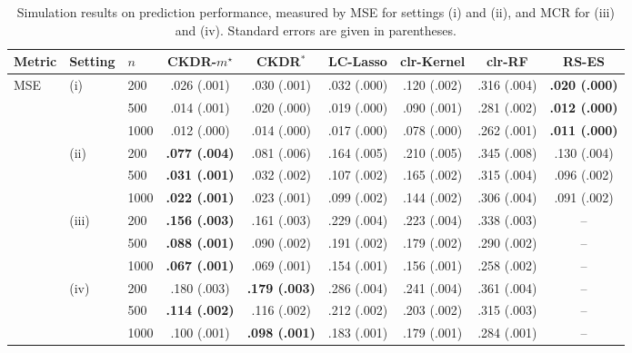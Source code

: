 \begin{table}[t]
\centering
\caption{Simulation results on prediction performance, measured by MSE for settings (i) and (ii), and MCR for (iii) and (iv). Standard errors are given in parentheses.}
\label{tab:simulation_predictions}
\scriptsize
\begin{tabular*}{\columnwidth}{@{\extracolsep{\fill}}lllcccccc}
\toprule
Metric & Setting & $n$ & CKDR-$m^\star$ & CKDR$^*$ & LC-Lasso & clr-Kernel & clr-RF & RS-ES \\
\midrule
 \multirow{7}{*}{MSE} & \multirow{3}{*}{(i)} & 200 & .026 (.001) & .030 (.001) & .032 (.000) & .120 (.002) & .316 (.004) & \textbf{.020 (.000)} \\
  &  & 500 & .014 (.001) & .020 (.000) & .019 (.000) & .090 (.001) & .281 (.002) & \textbf{.012 (.000)} \\
  &  & 1000 & .012 (.000) & .014 (.000) & .017 (.000) & .078 (.000) & .262 (.001) & \textbf{.011 (.000)} \\
 \addlinespace
  & \multirow{3}{*}{(ii)} & 200 & \textbf{.077 (.004)} & .081 (.006) & .164 (.005) & .210 (.005) & .345 (.008) & .130 (.004) \\
  &  & 500 & \textbf{.031 (.001)} & .032 (.002) & .107 (.002) & .165 (.002) & .315 (.004) & .096 (.002) \\
  &  & 1000 & \textbf{.022 (.001)} & .023 (.001) & .099 (.002) & .144 (.002) & .306 (.004) & .091 (.002) \\
\midrule
 \multirow{7}{*}{MCR} & \multirow{3}{*}{(iii)} & 200 & \textbf{.156 (.003)} & .161 (.003) & .229 (.004) & .223 (.004) & .338 (.003) & -- \\
  &  & 500 & \textbf{.088 (.001)} & .090 (.002) & .191 (.002) & .179 (.002) & .290 (.002) & -- \\
  &  & 1000 & \textbf{.067 (.001)} & .069 (.001) & .154 (.001) & .156 (.001) & .258 (.002) & -- \\
 \addlinespace
  & \multirow{3}{*}{(iv)} & 200 & .180 (.003) & \textbf{.179 (.003)} & .286 (.004) & .241 (.004) & .361 (.004) & -- \\
  &  & 500 & \textbf{.114 (.002)} & .116 (.002) & .212 (.002) & .203 (.002) & .315 (.003) & -- \\
  &  & 1000 & .100 (.001) & \textbf{.098 (.001)} & .183 (.001) & .179 (.001) & .284 (.001) & -- \\
\bottomrule
\end{tabular*}
\end{table}